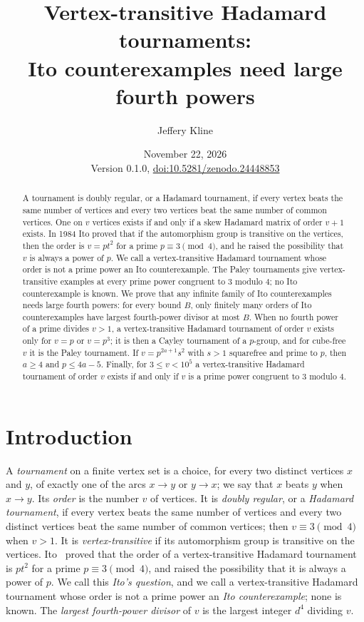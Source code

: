 \documentclass[11pt]{amsart}
\title[Vertex-transitive Hadamard tournaments]{Vertex-transitive Hadamard tournaments:\\ Ito counterexamples need large fourth powers}
\author{Jeffery Kline}
\date{November 22, 2026\\[3pt]\small Version 0.1.0, \href{https://doi.org/10.5281/zenodo.24448853}{doi:10.5281/zenodo.24448853}}
\theoremstyle{definition}
\theoremstyle{remark}
\begin{document}
\begin{abstract}
A tournament is doubly regular, or a Hadamard tournament, if every vertex beats the same number of vertices and every two vertices beat the same number of common vertices. One on $v$ vertices exists if and only if a skew Hadamard matrix of order $v+1$ exists. In 1984 Ito proved that if the automorphism group is transitive on the vertices, then the order is $v=pt^2$ for a prime $p\equiv3\pmod4$, and he raised the possibility that $v$ is always a power of $p$. We call a vertex-transitive Hadamard tournament whose order is not a prime power an Ito counterexample. The Paley tournaments give vertex-transitive examples at every prime power congruent to $3$ modulo $4$; no Ito counterexample is known. We prove that any infinite family of Ito counterexamples needs large fourth powers: for every bound $B$, only finitely many orders of Ito counterexamples have largest fourth-power divisor at most $B$. When no fourth power of a prime divides $v>1$, a vertex-transitive Hadamard tournament of order $v$ exists only for $v=p$ or $v=p^3$; it is then a Cayley tournament of a $p$-group, and for cube-free $v$ it is the Paley tournament. If $v=p^{2a+1}s^2$ with $s>1$ squarefree and prime to $p$, then $a\ge4$ and $p\le4a-5$. Finally, for $3\le v<10^5$ a vertex-transitive Hadamard tournament of order $v$ exists if and only if $v$ is a prime power congruent to $3$ modulo $4$.
\end{abstract}

\maketitle
\enlargethispage{4pt}

\section{Introduction}

A \emph{tournament} on a finite vertex set is a choice, for every two distinct vertices $x$ and $y$, of exactly one of the arcs $x\to y$ or $y\to x$; we say that $x$ beats $y$ when $x\to y$. Its \emph{order} is the number $v$ of vertices. It is \emph{doubly regular}, or a \emph{Hadamard tournament}, if every vertex beats the same number of vertices and every two distinct vertices beat the same number of common vertices; then $v\equiv3\pmod4$ when $v>1$. It is \emph{vertex-transitive} if its automorphism group is transitive on the vertices. Ito~\cite{Ito84} proved that the order of a vertex-transitive Hadamard tournament is $pt^2$ for a prime $p\equiv3\pmod4$, and raised the possibility that it is always a power of $p$. We call this \emph{Ito's question}, and we call a vertex-transitive Hadamard tournament whose order is not a prime power an \emph{Ito counterexample}; none is known. The \emph{largest fourth-power divisor} of $v$ is the largest integer $d^4$ dividing $v$.
\end{document}
